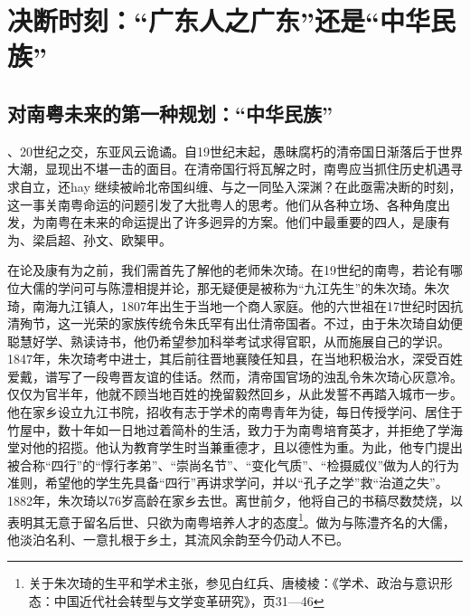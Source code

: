 \chapter{决断时刻：“广东人之广东”还是“中华民族”}

\section{对南粤未来的第一种规划：“中华民族”}

、20世纪之交，东亚风云诡谲。自19世纪末起，愚昧腐朽的清帝国日渐落后于世界大潮，显现出不堪一击的面目。在清帝国行将瓦解之时，南粤应当抓住历史机遇寻求自立，还hay 继续被岭北帝国纠缠、与之一同坠入深渊？在此亟需决断的时刻，这一事关南粤命运的问题引发了大批粤人的思考。他们从各种立场、各种角度出发，为南粤在未来的命运提出了许多迥异的方案。他们中最重要的四人，是康有为、梁启超、孙文、欧榘甲。

在论及康有为之前，我们需首先了解他的老师朱次琦。在19世纪的南粤，若论有哪位大儒的学问可与陈澧相提并论，那无疑便是被称为“九江先生”的朱次琦。朱次琦，南海九江镇人，1807年出生于当地一个商人家庭。他的六世祖在17世纪时因抗清殉节，这一光荣的家族传统令朱氏罕有出仕清帝国者。不过，由于朱次琦自幼便聪慧好学、熟读诗书，他仍希望参加科举考试求得官职，从而施展自己的学识。1847年，朱次琦考中进士，其后前往晋地襄陵任知县，在当地积极治水，深受百姓爱戴，谱写了一段粤晋友谊的佳话。然而，清帝国官场的浊乱令朱次琦心灰意冷。仅仅为官半年，他就不顾当地百姓的挽留毅然回乡，从此发誓不再踏入城市一步。他在家乡设立九江书院，招收有志于学术的南粤青年为徒，每日传授学问、居住于竹屋中，数十年如一日地过着简朴的生活，致力于为南粤培育英才，并拒绝了学海堂对他的招揽。他认为教育学生时当兼重德才，且以德性为重。为此，他专门提出被合称“四行”的“惇行孝弟”、“崇尚名节”、“变化气质”、“检摄威仪”做为人的行为准则，希望他的学生先具备“四行”再讲求学问，并以“孔子之学”救“治道之失”。1882年，朱次琦以76岁高龄在家乡去世。离世前夕，他将自己的书稿尽数焚烧，以表明其无意于留名后世、只欲为南粤培养人才的态度\footnote{关于朱次琦的生平和学术主张，参见白红兵、唐棱棱：《学术、政治与意识形态：中国近代社会转型与文学变革研究》，页31—46}。做为与陈澧齐名的大儒，他淡泊名利、一意扎根于乡土，其流风余韵至今仍动人不已。

